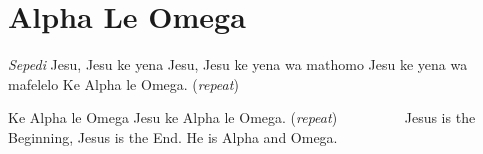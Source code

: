 \starttocol
\chapter{Alpha Le Omega}
\nexttocol
\hfill{\it Sepedi}
\stoptocol
\starttocol
\startlines
J{\sc esu}, Jesu ke yena
Jesu, Jesu ke yena wa mathomo 
Jesu ke yena wa mafelelo
Ke Alpha le Omega.    \hfill     ({\it repeat})~~~~~~~~~\hfill

Ke Alpha le Omega
Jesu ke Alpha le Omega.    \hfill     ({\it repeat})~~~~~~~~~\hfill
\stoplines
\nexttocol
Jesus is the Beginning,
Jesus is  the End.
He is Alpha and Omega.
\stoptocol

